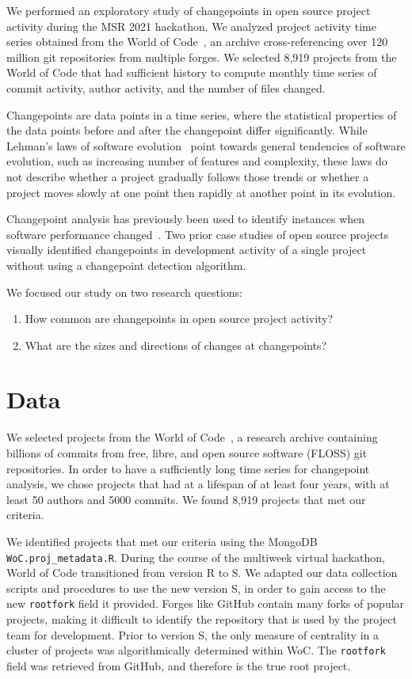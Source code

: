 \documentclass[10pt,conference]{IEEEtran}
\begin{document}
We performed an exploratory study of changepoints in open source project activity during the MSR 2021 hackathon. We analyzed project activity time series obtained from the World of Code~\cite{ma2019world}, an archive cross-referencing over 120 million git repositories from multiple forges. We selected 8,919 projects from the World of Code that had sufficient history to compute monthly time series of commit activity, author activity, and the number of files changed.

Changepoints are data points in a time series, where the statistical properties of the data points before and after the changepoint differ significantly. While Lehman's laws of software evolution~\cite{lehman1996laws} point towards general tendencies of software evolution, such as increasing number of features and complexity, these laws do not describe whether a project gradually follows those trends or whether a project moves slowly at one point then rapidly at another point in its evolution.

Changepoint analysis has previously been used to identify instances when software performance changed~\cite{cito2014identifying,muhlbauer2020identifying}. Two prior case studies of open source projects visually identified changepoints in development activity of a single project~\cite{gonzalez2014studying,openssl2020} without using a changepoint detection algorithm. 

We focused our study on two research questions:
\begin{enumerate}
    \item How common are changepoints in open source project activity?
    \item What are the sizes and directions of changes at changepoints?
\end{enumerate}

\section{Data}

We selected projects from the World of Code~\cite{ma2019world}, a research archive containing billions of commits from free, libre, and open source software (FLOSS) git repositories. In order to have a sufficiently long time series for changepoint analysis, we chose projects that had at a lifespan of at least four years, with at least 50 authors and 5000 commits. We found 8,919 projects that met our criteria.

We identified projects that met our criteria using the MongoDB \texttt{WoC.proj\_metadata.R}. During the course of the multiweek virtual hackathon, World of Code transitioned from version R to S. We adapted our data collection scripts and procedures to use the new version S, in order to gain access to the new \texttt{rootfork} field it provided. Forges like GitHub contain many forks of popular projects, making it difficult to identify the repository that is used by the project team for development. Prior to version S, the only measure of centrality in a cluster of projects was algorithmically determined within WoC. The \texttt{rootfork} field was retrieved from GitHub, and therefore is the true root project.
\end{document}

